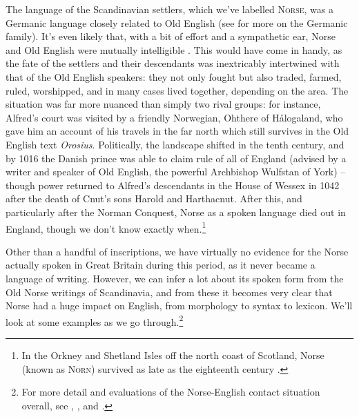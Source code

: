 The language of the Scandinavian settlers, which we've labelled \textsc{Norse}, was a Germanic language closely related to Old English (see  for more on the Germanic family). It's even likely that, with a bit of effort and a sympathetic ear, Norse and Old English were mutually intelligible \citep{Townend2002}. This would have come in handy, as the fate of the settlers and their descendants was inextricably intertwined with that of the Old English speakers: they not only fought but also traded, farmed, ruled, worshipped, and in many cases lived together, depending on the area. The situation was far more nuanced than simply two rival groups: for instance, Alfred's court was visited by a friendly Norwegian, Ohthere of Hålogaland, who gave him an account of his travels in the far north which still survives in the Old English text \emph{Orosius}. Politically, the landscape shifted in the tenth century, and by 1016 the Danish prince  was able to claim rule of all of England (advised by a writer and speaker of Old English, the powerful Archbishop Wulfstan of York) -- though power returned to Alfred's descendants in the House of Wessex in 1042 after the death of Cnut's sons Harold and Hartha\-cnut. After this, and particularly after the Norman Conquest, Norse as a spoken language died out in England, though we don't know exactly when.\footnote{In the Orkney and Shetland Isles off the north coast of Scotland, Norse (known as \textsc{Norn}) survived as late as the eighteenth century \citep{Barnes1998}.}

Other than a handful of inscriptions, we have virtually no evidence for the Norse actually spoken in Great Britain during this period, as it never became a language of writing. However, we can infer a lot about its spoken form from the Old Norse writings of Scandinavia, and from these it becomes very clear that Norse had a huge impact on English, from morphology to syntax to lexicon. We'll look at some examples as we go through.\footnote{For more detail and evaluations of the Norse-English contact situation overall, see \citet{Dance2012}, \citet{Lutz2012}, and \citet{Warner2017}.}


